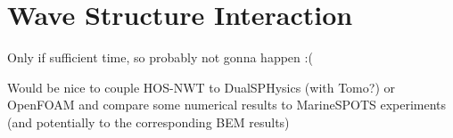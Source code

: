 \chapter{Wave Structure Interaction}\label{ch:wsi}
Only if sufficient time, so probably not gonna happen :(

Would be nice to couple HOS-NWT to DualSPHysics (with Tomo?) or OpenFOAM and compare some numerical results to MarineSPOTS experiments (and potentially to the corresponding BEM results)

\cleardoublepage

